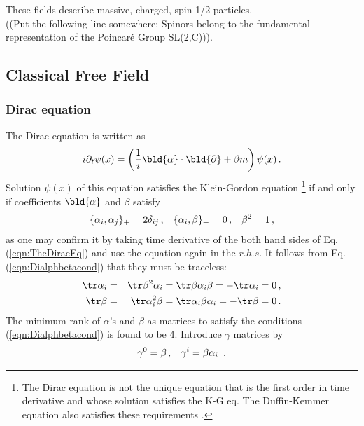 \noindent
These fields describe massive, charged, spin 1/2 particles.\\
((Put the following line somewhere: Spinors belong to the fundamental representation of the Poincar\'e Group SL(2,C))).
\subsection{Classical Free Field}

\subsubsection{Dirac equation}

The Dirac equation is written as
\begin{eqnarray}
i \partial_t \psi (x) = 
\left(
\frac{1}{i} \bld{\alpha} \cdot \bld{\partial} + \beta m \right) \psi(x) \,.
\label{eqn:TheDiracEq}
\end{eqnarray}
Solution $\psi(x)$ of this equation satisfies the Klein-Gordon equation
\footnote{%
The Dirac equation is not the unique equation that
is the  first order in time derivative and whose solution satisfies the K-G eq.
The Duffin-Kemmer equation  also satisfies these requirements
\cite{ref:Itzykson-Zuber}.
 } %
if and only if coefficients $\bld{\alpha}$ and $\beta$ satisfy
\begin{eqnarray}
\{ \alpha_i, \alpha_j \}_+ = 2\delta_{ij}\,,
\hspace{3mm}
\{ \alpha_i, \beta \}_+ = 0\,,
\hspace{3mm}
\beta^2 = 1\,,
\label{eqn:Dialphbetacond}
\end{eqnarray}
as one may confirm it by taking time derivative of the both hand sides of Eq. (\ref{eqn:TheDiracEq})
and use the equation again in the $r.h.s.$
It follows from Eq. (\ref{eqn:Dialphbetacond}) that they must be traceless:
\begin{eqnarray}
\tr \alpha_i &=& \tr \beta^2 \alpha_i = \tr \beta \alpha_i \beta = - \tr \alpha_i = 0 \,,
\nonumber\\
\tr \beta &=& \tr \alpha_i^2 \beta  = \tr \alpha_i \beta \alpha_i  = - \tr \beta = 0 \,.
\nonumber
\end{eqnarray}
The minimum rank of $\alpha$'s and $\beta$ as matrices to satisfy the conditions 
(\ref{eqn:Dialphbetacond}) is found to be 4. 
Introduce $\gamma$ matrices by
\begin{eqnarray}
\gamma^0 = \beta\,,
\hspace{3mm}
\gamma^i = \beta \alpha_i\ \,.
\end{eqnarray}
